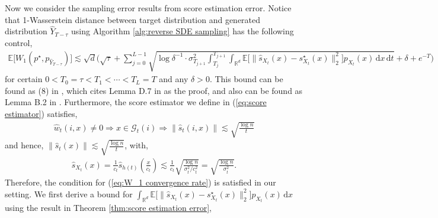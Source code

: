 \documentclass{article}
\newcommand{\diff}{\,\mathrm{d}}
\theoremstyle{plain}
\theoremstyle{remark}
\begin{document}
Now we consider the sampling error results from score estimation error. Notice that 1-Wasserstein distance between target distribution and generated distribution $\widehat{Y}_{T-\tau}$ using Algorithm \ref{alg:reverse SDE sampling} has the following control, 
\begin{align}
    \mathbb{E}\big[W_1(p^\star,p_{\widehat{Y}_{T-\tau}})\big]\lesssim \sqrt{d} \Big( \sqrt{\tau} + \sum_{j=0}^{L-1} \sqrt{\log \delta^{-1}\cdot \sigma_{T_{j+1}}^2 \int_{T_j}^{T_{j+1}} \int_{\mathbb{R}^d}\mathbb{E}\big[ \| \widehat{s}_{X_t}(x)-s_{X_t}^\star(x)\|_2^2\big] p_{X_t}(x) \diff x \diff t} + \delta + e^{-T} \Big) \label{eq:W_1 convergence rate} 
\end{align}
for certain $0<T_0=\tau < T_1< \cdots <T_L = T$ and any $\delta>0$. 
This bound can be found as (8) in \citet{azangulov2025convergencediffusionmodelsmanifold}, which cites Lemma D.7 in \citet{oko2023diffusionmodelsminimaxoptimal} as the proof, and also can be found as Lemma B.2 in \citet{tang24a}. Furthermore, the score estimator we define in (\ref{eq:score estimator}) satisfies, 
\begin{align*}
    \widehat{w}_t(i,x) \neq 0 \Longrightarrow x \in \mathcal{G}_t(i) \Longrightarrow \|\widehat{s}_t(i,x)\| \lesssim \sqrt{\frac{\log n}{t}} 
\end{align*}
and hence, $\|\widehat{s}_t(x)\|\lesssim \sqrt{\frac{\log n}{t}}$, with, 
\begin{align*}
    \widehat{s}_{X_t}(x) = \frac{1}{c_t } \widehat{s}_{h(t)}(\frac{x}{c_t}) \lesssim \frac{1}{c_t} \sqrt{\frac{\log n}{\sigma_t^2/c_t^2}} = \sqrt{\frac{\log n}{\sigma_t^2}}.
\end{align*}
Therefore, the condition for (\ref{eq:W_1 convergence rate}) is satisfied in our setting. We first derive a bound for $ \int_{\mathbb{R}^d}\mathbb{E}\big[ \| \widehat{s}_{X_t}(x)-s^\star_{X_t}(x)\|_2^2\big] p_{X_t}(x)\diff x $ using the result in Theorem \ref{thm:score estimation error}, 
\end{document}
